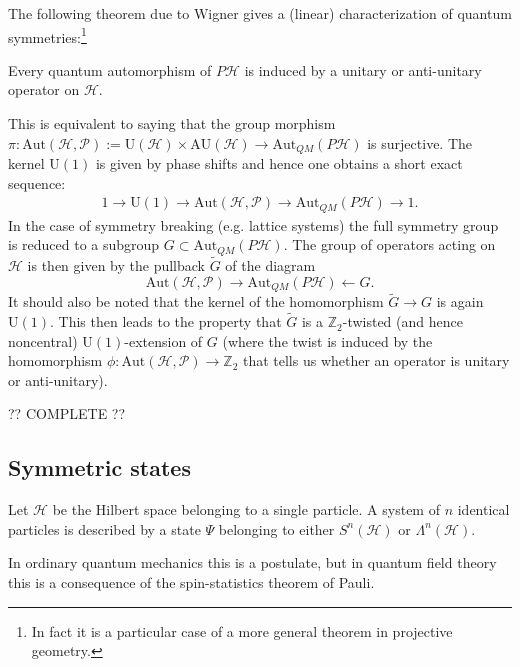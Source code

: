     The following theorem due to Wigner gives a (linear) characterization of quantum symmetries:\footnote{In fact it is a particular case of a more general theorem in projective geometry.}
    \begin{theorem}[Wigner]
        Every quantum automorphism of $P\mathcal{H}$ is induced by a unitary or anti-unitary operator on $\mathcal{H}$.
    \end{theorem}
    This is equivalent to saying that the group morphism $\pi:\text{Aut}(\mathcal{H}, \mathcal{P}):=\text{U}(\mathcal{H})\times\text{AU}(\mathcal{H})\rightarrow\text{Aut}_{QM}(P\mathcal{H})$ is surjective. The kernel $\text{U}(1)$ is given by phase shifts and hence one obtains a short exact sequence:
    \begin{gather}
        1\longrightarrow\text{U}(1)\longrightarrow\text{Aut}(\mathcal{H}, \mathcal{P})\longrightarrow\text{Aut}_{QM}(P\mathcal{H})\longrightarrow1.
    \end{gather}
    In the case of symmetry breaking (e.g. lattice systems) the full symmetry group is reduced to a subgroup $G\subset\text{Aut}_{QM}(P\mathcal{H})$. The group of operators acting on $\mathcal{H}$ is then given by the pullback $\widetilde{G}$ of the diagram \[\text{Aut}(\mathcal{H}, \mathcal{P})\longrightarrow\text{Aut}_{QM}(P\mathcal{H})\longleftarrow G.\] It should also be noted that the kernel of the homomorphism $\widetilde{G}\rightarrow G$ is again $\text{U}(1)$. This then leads to the property that $\widetilde{G}$ is a $\mathbb{Z}_2$-twisted (and hence noncentral) $\text{U}(1)$-extension of $G$ (where the twist is induced by the homomorphism $\phi:\text{Aut}(\mathcal{H},\mathcal{P})\rightarrow\mathbb{Z}_2$ that tells us whether an operator is unitary or anti-unitary).

    ?? COMPLETE ??

\subsection{Symmetric states}

    \begin{axiom}
        Let $\mathcal{H}$ be the Hilbert space belonging to a single particle. A system of $n$ identical particles is described by a state $\Psi$ belonging to either $S^n(\mathcal{H})$ or $\Lambda^n(\mathcal{H})$.
    \end{axiom}
    \begin{remark}
        In ordinary quantum mechanics this is a postulate, but in quantum field theory this is a consequence of the spin-statistics theorem of Pauli.
    \end{remark}

